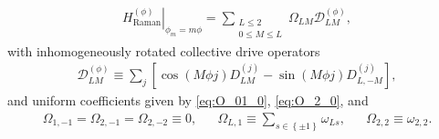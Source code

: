 \documentclass[nofootinbib,notitlepage,11pt]{revtex4-2}
\renewcommand{\t}{\text} %
\newcommand{\p}[1]{\left(#1\right)} %
\renewcommand{\sp}[1]{\left[#1\right]} %
\renewcommand{\set}[1]{\left\{#1\right\}} %
\newcommand{\1}{\mathds{1}}
\newcommand{\D}{\mathcal{D}}
\begin{document}
\begin{align}
  \left. H_{\t{Raman}}^{(\phi)} \right|_{\phi_m=m\phi}
  = \sum_{\substack{L\le2\\0\le M\le L}} \Omega_{LM} \D_{LM}^{(\phi)},
\end{align}
with inhomogeneously rotated collective drive operators
\begin{align}
  \D_{LM}^{(\phi)}
  \equiv \sum_j \sp{\cos\p{M\phi j} D_{LM}^{(j)}
    - \sin\p{M\phi j} D_{L,-M}^{(j)}},
\end{align}
and uniform coefficients given by \eqref{eq:O_01_0}, \eqref{eq:O_2_0},
and
\begin{align}
  \Omega_{1,-1} = \Omega_{2,-1} = \Omega_{2,-2} \equiv 0,
  &&
  \Omega_{L,1} \equiv \sum_{s\in\set{\pm1}} \omega_{Ls},
  &&
  \Omega_{2,2} \equiv \omega_{2,2}.
\end{align}



\end{document}
